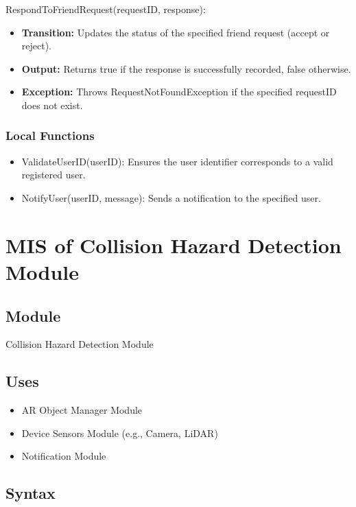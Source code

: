 \documentclass[12pt, titlepage]{article}
\begin{document}
\noindent RespondToFriendRequest(requestID, response):
\begin{itemize}
  \item \textbf{Transition:} Updates the status of the specified friend request (accept or reject).
  \item \textbf{Output:} Returns true if the response is successfully recorded, false otherwise.
  \item \textbf{Exception:} Throws RequestNotFoundException if the specified requestID does not exist.
\end{itemize}

\subsubsection{Local Functions}

\begin{itemize}
  \item ValidateUserID(userID): Ensures the user identifier corresponds to a valid registered user.
  \item NotifyUser(userID, message): Sends a notification to the specified user.
\end{itemize}

\newpage


\section{MIS of Collision Hazard Detection Module} \label{Module_CollisionHazardDetection}

\subsection{Module}

Collision Hazard Detection Module

\subsection{Uses}

\begin{itemize}
  \item AR Object Manager Module
  \item Device Sensors Module (e.g., Camera, LiDAR)
  \item Notification Module
\end{itemize}

\subsection{Syntax}
\end{document}
